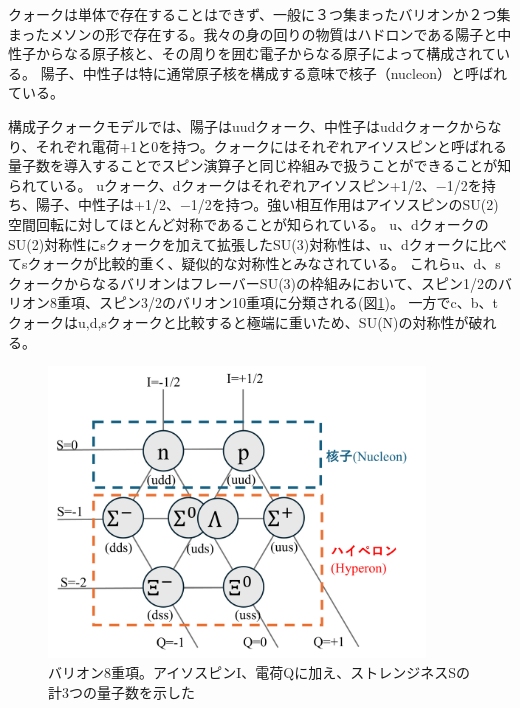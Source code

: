 \documentclass[a4paper,11pt,uplatex]{jsbook}
\begin{document}
クォークは単体で存在することはできず、一般に３つ集まったバリオンか２つ集まったメソンの形で存在する。我々の身の回りの物質はハドロンである陽子と中性子からなる原子核と、その周りを囲む電子からなる原子によって構成されている。
陽子、中性子は特に通常原子核を構成する意味で核子（nucleon）と呼ばれている。

構成子クォークモデルでは、陽子はuudクォーク、中性子はuddクォークからなり、それぞれ電荷+1と0を持つ。クォークにはそれぞれアイソスピンと呼ばれる量子数を導入することでスピン演算子と同じ枠組みで扱うことができることが知られている。
uクォーク、dクォークはそれぞれアイソスピン+1/2、$-$1/2を持ち、陽子、中性子は+1/2、$-$1/2を持つ。強い相互作用はアイソスピンのSU(2)空間回転に対してほとんど対称であることが知られている。
u、dクォークのSU(2)対称性にsクォークを加えて拡張したSU(3)対称性は、u、dクォークに比べてsクォークが比較的重く、疑似的な対称性とみなされている。
これらu、d、sクォークからなるバリオンはフレーバーSU(3)の枠組みにおいて、スピン1/2のバリオン8重項、スピン3/2のバリオン10重項に分類される(図\ref{fig:baryon})。
一方でc、b、t クォークはu,d,sクォークと比較すると極端に重いため、SU(N)の対称性が破れる。
\begin{figure}[tb]
  \centering
  \includegraphics[width=10cm]{image/1_baryon.png}
  \caption[バリオン8重項]{バリオン8重項。アイソスピンI、電荷Qに加え、ストレンジネスSの計3つの量子数を示した}
  \label{fig:baryon}
\end{figure}
\end{document}
